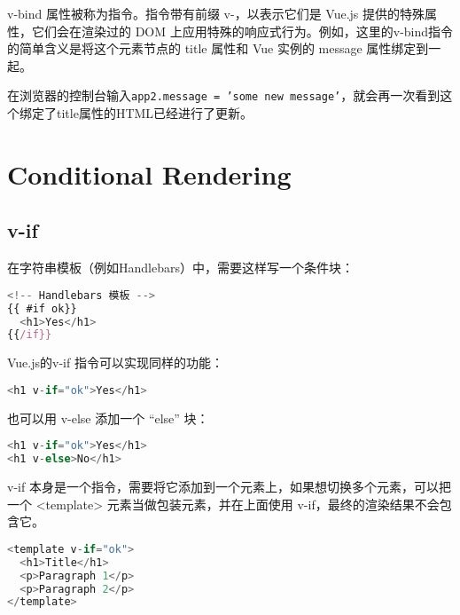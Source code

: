 v-bind 属性被称为指令。指令带有前缀 v-，以表示它们是 Vue.js 提供的特殊属性，它们会在渲染过的 DOM 上应用特殊的响应式行为。例如，这里的v-bind指令的简单含义是将这个元素节点的 title 属性和 Vue 实例的 message 属性绑定到一起。

在浏览器的控制台输入\texttt{app2.message = 'some new message'}，就会再一次看到这个绑定了title属性的HTML已经进行了更新。



\section{Conditional Rendering}

\subsection{v-if}

在字符串模板（例如Handlebars）中，需要这样写一个条件块：


\begin{lstlisting}[language=JavaScript]
<!-- Handlebars 模板 -->
{{ #if ok}}
  <h1>Yes</h1>
{{/if}}
\end{lstlisting}

Vue.js的v-if 指令可以实现同样的功能：

\begin{lstlisting}[language=JavaScript]
<h1 v-if="ok">Yes</h1>
\end{lstlisting}

也可以用 v-else 添加一个 “else” 块：

\begin{lstlisting}[language=JavaScript]
<h1 v-if="ok">Yes</h1>
<h1 v-else>No</h1>
\end{lstlisting}

v-if 本身是一个指令，需要将它添加到一个元素上，如果想切换多个元素，可以把一个 <template> 元素当做包装元素，并在上面使用 v-if，最终的渲染结果不会包含它。


\begin{lstlisting}[language=JavaScript]
<template v-if="ok">
  <h1>Title</h1>
  <p>Paragraph 1</p>
  <p>Paragraph 2</p>
</template>
\end{lstlisting}



\begin{lstlisting}[language=JavaScript]

\end{lstlisting}



